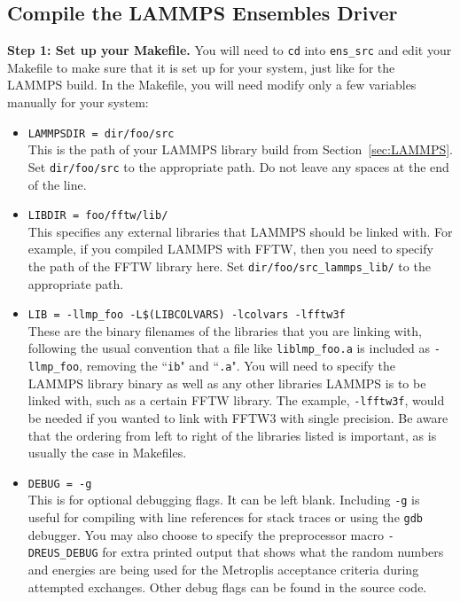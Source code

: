 \documentclass[10pt]{article}
\begin{document}
\subsection{Compile the LAMMPS Ensembles Driver}

\textbf{Step 1: Set up your Makefile.}
You will need to \texttt{cd} into \texttt{ens\_src} and edit your Makefile to 
make sure that it is set up for your system, just like for the LAMMPS build.
In the Makefile, you will need modify only a few variables manually for your system:
\begin{itemize}
	\item \texttt{LAMMPSDIR = dir/foo/src}\\
		  	This is the path of your LAMMPS library build from Section~\ref{sec:LAMMPS}.
		  	Set \texttt{dir/foo/src} to the appropriate path. Do not leave any spaces at the end of the line.
		  
	\item \texttt{LIBDIR = foo/fftw/lib/}\\
			This specifies any external libraries that LAMMPS should be linked with. For example,
			if you compiled LAMMPS with FFTW, then you need to specify the path of the FFTW
			library here. Set \texttt{dir/foo/src\_lammps\_lib/} to the appropriate path.
			
	\item \texttt{LIB = -llmp\_foo -L\$(LIBCOLVARS) -lcolvars -lfftw3f}\\
			These are the binary filenames of the libraries that you are linking with, following
			the usual convention that a file like \texttt{liblmp\_foo.a} is included as
			\texttt{-llmp\_foo}, removing the ``\texttt{ib}" and ``\texttt{.a}". You will
			need to specify the LAMMPS library binary as well as any other libraries LAMMPS
			is to be linked with, such as a certain FFTW library. The example, \texttt{-lfftw3f},
			would be needed if you wanted to link with FFTW3 with single precision. Be aware that the ordering
			from left to right of the libraries listed is important, as is usually the case in Makefiles.
			
			
	\item \texttt{DEBUG = -g}\\
			This is for optional debugging flags. It can be left blank. Including \texttt{-g}
			is useful for compiling with line references for stack traces or using the 
			\texttt{gdb} debugger. You may also choose to specify the preprocessor macro
			\texttt{-DREUS\_DEBUG} for extra printed output that shows what the random
			numbers and energies are being used for the Metroplis acceptance criteria
			during attempted exchanges. Other debug flags can be found in the source code.
			

\end{itemize}
\end{document}
